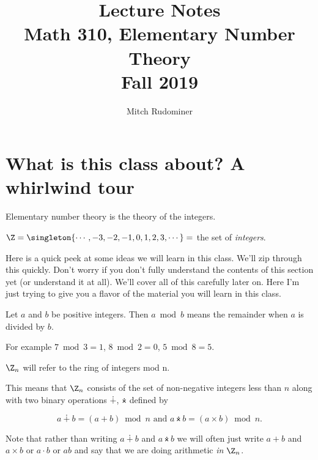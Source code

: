 \documentclass[oneside,12pt]{amsart}
\begin{document}
\title{Lecture Notes \\ Math 310, Elementary Number Theory \\ Fall 2019}
\author{Mitch Rudominer}

\maketitle

\tableofcontents


\newpage

\section{What is this class about? A whirlwind tour}

Elementary number theory is the theory of the integers.

$\Z = \singleton{\cdots, -3, -2, -1, 0, 1, 2, 3, \cdots} = $ the set of \emph{integers}.

Here is a quick peek at some ideas we will learn in this class. We'll zip through this quickly. Don't
worry if you don't fully understand the contents of this section yet (or understand it at all).
We'll cover all of this carefully later on. Here I'm just trying
to give you a flavor of the material you will learn in this class.

\begin{definition}
\label{ModOperatorTake1}
Let $a$ and $b$ be positive integers. Then $a \bmod b$ means the remainder when $a$ is divided by $b$.
\end{definition}

For example $7\bmod 3 = 1$, $8\bmod 2 = 0$, $5\bmod 8 = 5$.

\begin{definition} $\Z_n$ will refer to the ring of integers mod n. \end{definition}

This means that $\Z_n$ consists of the set of non-negative integers less than $n$ along
with two binary operations $\dotplus$, $\dottimes$ defined by

$$a \dotplus b = (a + b) \bmod n \text{ and } a \dottimes b = (a \times b) \bmod n.$$

Note that rather than writing $a\dotplus b$ and $a\dottimes b$ we will often just write
$a+b$ and $a\times b$ or $a\cdot b$ or $a b$ and say that we are doing arithmetic \emph{in $\Z_n$}.
\end{document}
